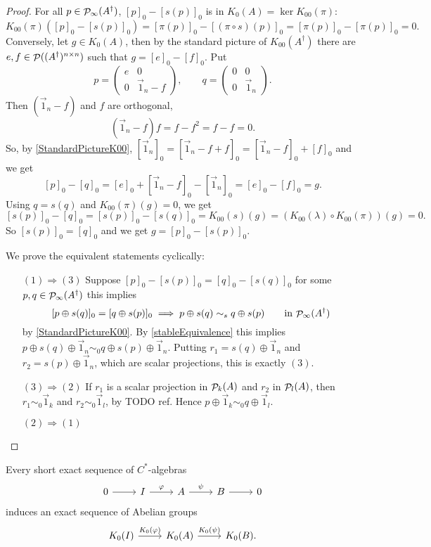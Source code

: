 \begin{proof}
For all $p\in\mathop{\mathcal{P}}\nolimits_\infty(A^\dagger)$, $[p]_0 - [s(p)]_0$ is in $K_0(A) = \ker K_{00}(\pi)$:
\[ K_{00}(\pi)([p]_0 - [s(p)]_0) = [\pi(p)]_0 - [(\pi\circ s)(p)]_0 = [\pi(p)]_0 - [\pi(p)]_0 = 0. \]
Conversely, let $g\in K_0(A)$, then by the standard picture of $K_{00}(A^\dagger)$ there are $e,f\in \mathop{\mathcal{P}}\nolimits((A^\dagger)^{n\times n})$ such that $g = [e]_0 - [f]_0$. Put
\[ p = \begin{pmatrix}
e & 0 \\ 0 & \vec{1}_n - f
\end{pmatrix}, \qquad q = \begin{pmatrix}
0 & 0 \\ 0 & \vec{1}_n
\end{pmatrix}. \]
Then $(\vec{1}_n - f)$ and $f$ are orthogonal,
\[ (\vec{1}_n - f)f = f - f^2 = f-f = 0. \]
So, by \ref{StandardPictureK00}, $[\vec{1}_n]_0 = [\vec{1}_n -f + f]_0 = [\vec{1}_n -f]_0 + [f]_0$ and we get
\[ [p]_0 - [q]_0 = [e]_0 + [\vec{1}_n - f]_0 - [\vec{1}_n]_0 = [e]_0 - [f]_0 = g. \]
Using $q = s(q)$ and $K_{00}(\pi)(g) = 0$, we get
\[ [s(p)]_0 - [q]_0 = [s(p)]_0 - [s(q)]_0 = K_{00}(s)(g) = (K_{00}(\lambda)\circ K_{00}(\pi))(g) = 0. \]
So $[s(p)]_0 = [q]_0$ and we get $g = [p]_0 - [s(p)]_0$.

We prove the equivalent statements cyclically:
\begin{itemize}
\item[$\boxed{(1) \Rightarrow (3)}$] Suppose $[p]_0-[s(p)]_0 = [q]_0 - [s(q)]_0$ for some $p,q\in\mathop{\mathcal{P}}\nolimits_\infty(A^\dagger)$ this implies
\[ [p\oplus s(q)]_0 = [q\oplus s(p)]_0 \implies p\oplus s(q) \sim_s q\oplus s(p) \qquad \text{in $\mathop{\mathcal{P}}\nolimits_\infty(A^\dagger)$} \]
by \ref{StandardPictureK00}. By \ref{stableEquivalence} this implies $p\oplus s(q)\oplus \vec{1}_n \sim_0 q \oplus s(p) \oplus \vec{1}_n$. Putting $r_1 = s(q)\oplus \vec{1}_n$ and $r_2 = s(p) \oplus \vec{1}_n$, which are scalar projections, this is exactly $(3)$.
\item[$\boxed{(3) \Rightarrow (2)}$] If $r_1$ is a scalar projection in $\mathop{\mathcal{P}}\nolimits_k(A)$ and $r_2$ in $\mathop{\mathcal{P}}\nolimits_l(A)$, then $r_1\sim_0 \vec{1}_k$ and $r_2 \sim_0 \vec{1}_l$, by TODO ref. Hence $p\oplus \vec{1}_k \sim_0 q \oplus \vec{1}_l$.
\item[$\boxed{(2) \Rightarrow (1)}$] 
\end{itemize}
\end{proof}

\begin{proposition}
Every short exact sequence of $C^*$-algebras
\[ \begin{tikzcd}
0 \rar & I \rar{\varphi} & A \rar{\psi} & B \rar & 0
\end{tikzcd} \]
induces an exact sequence of Abelian groups
\[ \begin{tikzcd}
K_0(I) \rar{K_0(\varphi)} & K_0(A) \rar{K_0(\psi)} & K_0(B).
\end{tikzcd} \]
\end{proposition}


